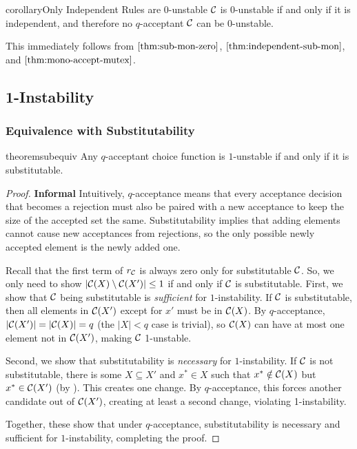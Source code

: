\begin{restatable}{corollary}{Only Independent Rules are 0-unstable}
\label{thm:independent-zero-unstable}
$\mathcal{C}$ is $0$-unstable if and only if it is independent, and therefore no $q$-acceptant $\mathcal{C}$ can be $0$-unstable.
\end{restatable}

This immediately follows from $\Cref{thm:sub-mon-zero}$, $\Cref{thm:independent-sub-mon}$, and $\Cref{thm:mono-accept-mutex}$.

\subsection{1-Instability} \label{sec:1-unstable-appendix}

\subsubsection{Equivalence with Substitutability} \label{sec:sub-equiv-proof}

\begin{restatable}{theorem}{subequiv}
\label{thm:sub-unstable-equiv}
Any $q$-acceptant choice function is $1$-unstable if and only if it is substitutable.
\end{restatable}

\begin{proof}
\textbf{Informal}
Intuitively, $q$-acceptance means that every acceptance decision that becomes a rejection must also be paired with a new acceptance to keep the size of the accepted set the same. Substitutability implies that adding elements cannot cause new acceptances from rejections, so the only possible newly accepted element is the newly added one.

Recall that the first term of $r_{\mathcal{C}}$ is always zero only for substitutable $\mathcal{C}$. So, we only need to show $|\mathcal{C}(X) \setminus \mathcal{C}(X')| \leq 1$ if and only if $\mathcal{C}$ is substitutable. %
First, we show that $\mathcal{C}$ being substitutable is \textit{sufficient} for $1$-instability. If $\mathcal{C}$ is substitutable, then all elements in $\mathcal{C}(X')$ except for $x'$ must be in $\mathcal{C}(X)$. By $q$-acceptance, $|\mathcal{C}(X')| = |\mathcal{C}(X)| = q$ (the $|X| < q$ case is trivial), so $\mathcal{C}(X)$ can have at most one element not in $\mathcal{C}(X')$, making $\mathcal{C}$ 1-unstable.

Second, we show that substitutability is \textit{necessary} for $1$-instability. If $\mathcal{C}$ is not substitutable, there is some $X \subseteq X'$ and $x^* \in X$ such that $x^* \notin \mathcal{C}(X)$ but $x^* \in \mathcal{C}(X')$ (by ). This creates one change. By $q$-acceptance, this forces another candidate out of $\mathcal{C}(X')$, creating at least a second change, violating 1-instability.

Together, these show that under $q$-acceptance, substitutability is necessary and sufficient for $1$-instability, completing the proof.
\end{proof}


